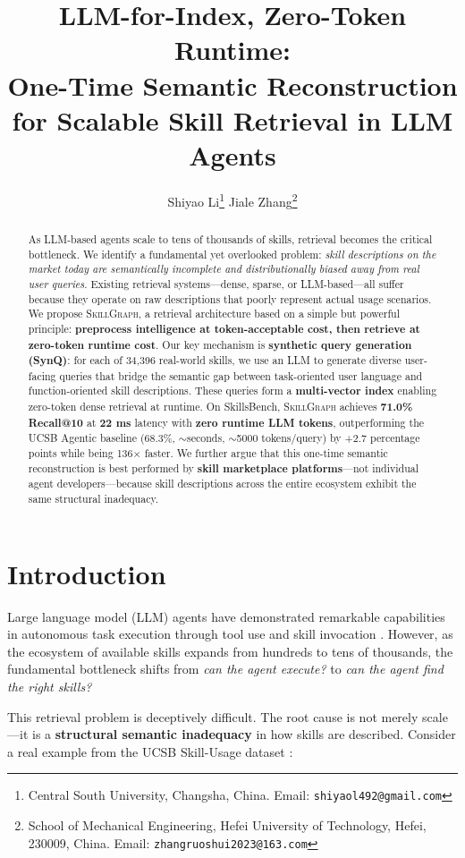 \documentclass[11pt,a4paper]{article}
\title{\textbf{LLM-for-Index, Zero-Token Runtime:}\\[0.3em]
\textbf{One-Time Semantic Reconstruction for Scalable Skill Retrieval in LLM Agents}}
\author{
  Shiyao Li\thanks{Central South University, Changsha, China. Email: \texttt{shiyaol492@gmail.com}} \quad
  Jiale Zhang\thanks{School of Mechanical Engineering, Hefei University of Technology, Hefei, 230009, China. Email: \texttt{zhangruoshui2023@163.com}}
}
\date{}
\newcommand{\ours}{\textsc{SkillGraph}}
\newcommand{\ucsb}{\textsc{UCSB}}
\begin{document}
\maketitle

\begin{abstract}
As LLM-based agents scale to tens of thousands of skills, retrieval becomes the critical bottleneck. We identify a fundamental yet overlooked problem: \emph{skill descriptions on the market today are semantically incomplete and distributionally biased away from real user queries}. Existing retrieval systems---dense, sparse, or LLM-based---all suffer because they operate on raw descriptions that poorly represent actual usage scenarios. We propose \ours{}, a retrieval architecture based on a simple but powerful principle: \textbf{preprocess intelligence at token-acceptable cost, then retrieve at zero-token runtime cost}. Our key mechanism is \textbf{synthetic query generation (SynQ)}: for each of 34,396 real-world skills, we use an LLM to generate diverse user-facing queries that bridge the semantic gap between task-oriented user language and function-oriented skill descriptions. These queries form a \textbf{multi-vector index} enabling zero-token dense retrieval at runtime. On SkillsBench, \ours{} achieves \textbf{71.0\% Recall@10} at \textbf{22 ms} latency with \textbf{zero runtime LLM tokens}, outperforming the \ucsb{} Agentic baseline (68.3\%, $\sim$seconds, $\sim$5000 tokens/query) by +2.7 percentage points while being 136$\times$ faster. We further argue that this one-time semantic reconstruction is best performed by \textbf{skill marketplace platforms}---not individual agent developers---because skill descriptions across the entire ecosystem exhibit the same structural inadequacy.
\end{abstract}

\section{Introduction}
\label{sec:introduction}

Large language model (LLM) agents have demonstrated remarkable capabilities in autonomous task execution through tool use and skill invocation \citep{react2022}. However, as the ecosystem of available skills expands from hundreds to tens of thousands, the fundamental bottleneck shifts from \emph{can the agent execute?} to \emph{can the agent find the right skills?}

This retrieval problem is deceptively difficult. The root cause is not merely scale---it is a \textbf{structural semantic inadequacy} in how skills are described. Consider a real example from the UCSB Skill-Usage dataset \citep{ucsb2026}:
\end{document}
